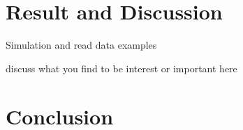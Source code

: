 \documentclass[11pt]{article}
\begin{document}
\section{Result and Discussion}

Simulation and read data examples


discuss what you find to be interest or important here

\section{Conclusion}

\end{document}
